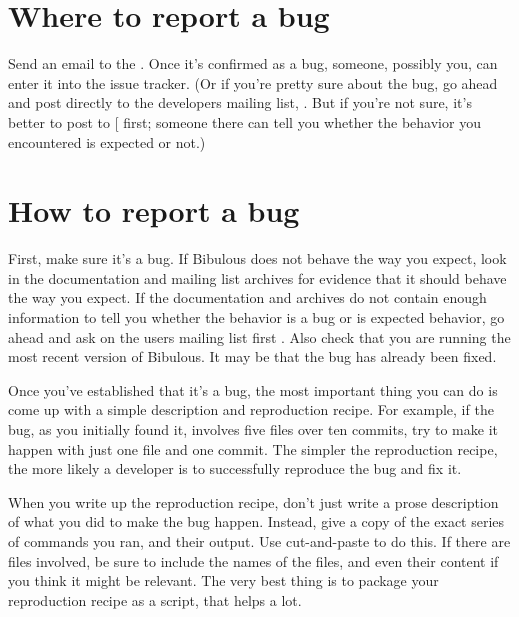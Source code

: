 \documentclass[letterpaper,10pt,english]{sphinxmanual}
\begin{document}
\section{Where to report a bug}
\label{\detokenize{instructions_for_reporting_bugs:where-to-report-a-bug}}
Send an email to the . Once it’s confirmed as a bug, someone, possibly you, can enter it into the issue tracker. (Or if you’re pretty sure about the bug, go ahead and post directly to the developers mailing list, . But if you’re not sure, it’s better to post to {[}\sphinxcode{\sphinxupquote{users mailing list}}{]} first; someone there can tell you whether the behavior you encountered is expected or not.)


\section{How to report a bug}
\label{\detokenize{instructions_for_reporting_bugs:how-to-report-a-bug}}
First, make sure it’s a bug. If Bibulous does not behave the way you expect, look in the documentation and mailing list archives for evidence that it should behave the way you expect. If the documentation and archives do not contain enough information to tell you whether the behavior is a bug or is expected behavior, go ahead and ask on the users mailing list first . Also check that you are running the most recent version of Bibulous. It may be that the bug has already been fixed.

Once you’ve established that it’s a bug, the most important thing you can do is come up with a simple description and reproduction recipe. For example, if the bug, as you initially found it, involves five files over ten commits, try to make it happen with just one file and one commit. The simpler the reproduction recipe, the more likely a developer is to successfully reproduce the bug and fix it.

When you write up the reproduction recipe, don’t just write a prose description of what you did to make the bug happen. Instead, give a copy of the exact series of commands you ran, and their output. Use cut-and-paste to do this. If there are files involved, be sure to include the names of the files, and even their content if you think it might be relevant. The very best thing is to package your reproduction recipe as a script, that helps a lot.
\end{document}
